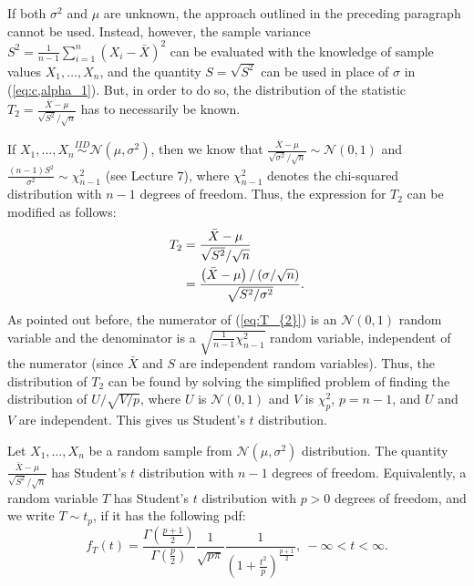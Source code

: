 \documentclass[a4paper,english,12pt]{article}
\begin{document}
\par If both $ \sigma^{2} $ and $ \mu $ are unknown, the approach outlined in the preceding paragraph cannot be used. Instead, however, the sample variance $ S^{2}=\frac{1}{n-1}\sum\limits_{i=1}^{n} \left(X_{i}-\bar{X}\right)^{2} $ can be evaluated with the knowledge of sample values $ X_{1},\ldots,X_{n} $, and the quantity $ S=\sqrt{S^{2}} $ can be used in place of $ \sigma $ in  (\ref*{eq:c,alpha_1}). But, in order to do so, the distribution of the statistic $ T_{2}=\frac{\bar{X}-\mu}{\sqrt{S^{2}}/\sqrt{n}} $ has to necessarily be known.
\par If $ X_{1},\ldots,X_{n}\stackrel{IID}{\sim} \mathcal{N}(\mu,\sigma^{2}) $, then we know that $ \frac{\bar{X}-\mu}{\sqrt{\sigma^{2}}/\sqrt{n}}\sim \mathcal{N}(0,1) $ and $ \frac{(n-1)S^{2}}{\sigma^{2}} \sim \chi_{n-1}^{2} $ (see Lecture $ 7 $), where $ \chi_{n-1}^{2} $ denotes the chi-squared distribution with $ n-1 $ degrees of freedom. Thus, the expression for $ T_{2} $ can be modified as follows:
\begin{align}
T_{2}&=\frac{\bar{X}-\mu}{\sqrt{S^{2}}/\sqrt{n}}\nonumber\\
     &=\frac{\left(\bar{X}-\mu\right)/\left(\sigma/\sqrt{n}\right)}{\sqrt{S^{2}/\sigma^2}}.\label{eq:T_{2}}
\end{align}
As pointed out before, the numerator of  (\ref*{eq:T_{2}}) is an $ \mathcal{N}(0,1) $ random variable and the denominator is a $ \sqrt{\frac{1}{n-1}\chi_{n-1}^{2}} $ random variable, independent of the numerator (since $ \bar{X} $ and $ S $ are independent random variables). Thus, the distribution of $ T_{2} $ can be found by solving the simplified problem of finding the distribution of $ U/\sqrt{V/p} $, where $ U $ is $ \mathcal{N}(0,1) $ and $ V $ is $ \chi_{p}^{2} $, $ p=n-1 $, and $ U $ and $ V $ are independent. This gives us Student's $ t $ distribution.
\begin{defn}
	Let $ X_{1},\ldots,X_{n} $ be a random sample from $ \mathcal{N}(\mu,\sigma^{2}) $ distribution. The quantity $ \frac{\bar{X}-\mu}{\sqrt{S^{2}}/\sqrt{n}} $ has Student's $ t $ distribution with $ n-1 $ degrees of freedom. Equivalently, a random variable $ T $ has Student's $ t $ distribution with $ p>0 $ degrees of freedom, and we write $ T\sim t_{p} $, if it has the following pdf:
	\begin{equation}
	f_{T}(t)=\frac{\Gamma\left(\frac{p+1}{2}\right)}{\Gamma\left(\frac{p}{2}\right)} \frac{1}{\sqrt{p\pi}} \frac{1}{\left(1+\frac{t^{2}}{p}\right)^{\frac{p+1}{2}}},~-\infty < t < \infty.\label{eq:pdf_ST}
	\end{equation}
\end{defn}
\end{document}

